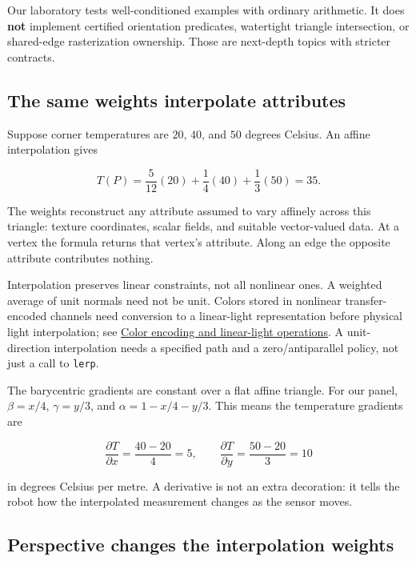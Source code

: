 Our laboratory tests well-conditioned examples with ordinary arithmetic. It does \textbf{not} implement certified orientation predicates, watertight triangle intersection, or shared-edge rasterization ownership. Those are next-depth topics with stricter contracts.

\subsection{The same weights interpolate attributes}\label{01-foundations-i-ch018-the-same-weights-interpolate-attributes}

\hypertarget{01-foundations-i-ch018-the-same-weights-interpolate-attributes}{}

Suppose corner temperatures are \(20\), \(40\), and \(50\) degrees Celsius. An affine interpolation gives

\[
T(P)=\frac5{12}(20)+\frac14(40)+\frac13(50)=35.
\]

The weights reconstruct any attribute assumed to vary affinely across this triangle: texture coordinates, scalar fields, and suitable vector-valued data. At a vertex the formula returns that vertex's attribute. Along an edge the opposite attribute contributes nothing.

Interpolation preserves linear constraints, not all nonlinear ones. A weighted average of unit normals need not be unit. Colors stored in nonlinear transfer-encoded channels need conversion to a linear-light representation before physical light interpolation; see \hyperref[appendix-a9f83ad40792]{Color encoding and linear-light operations}. A unit-direction interpolation needs a specified path and a zero/antiparallel policy, not just a call to \texttt{lerp}.

The barycentric gradients are constant over a flat affine triangle. For our panel, \(\beta=x/4\), \(\gamma=y/3\), and \(\alpha=1-x/4-y/3\). This means the temperature gradients are

\[
\frac{\partial T}{\partial x}=\frac{40-20}{4}=5,
\qquad
\frac{\partial T}{\partial y}=\frac{50-20}{3}=10
\]

in degrees Celsius per metre. A derivative is not an extra decoration: it tells the robot how the interpolated measurement changes as the sensor moves.

\subsection{Perspective changes the interpolation weights}\label{01-foundations-i-ch018-perspective-changes-the-interpolation-weights}

